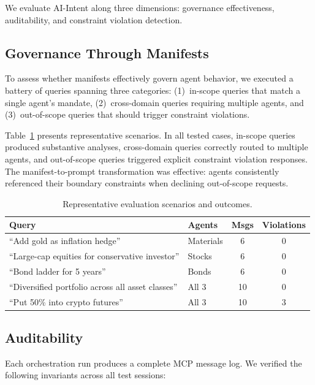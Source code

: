 \documentclass[runningheads]{llncs}
\begin{document}
We evaluate AI-Intent along three dimensions: governance effectiveness, auditability, and constraint violation detection.

\subsection{Governance Through Manifests}

To assess whether manifests effectively govern agent behavior, we executed a battery of queries spanning three categories: (1)~in-scope queries that match a single agent's mandate, (2)~cross-domain queries requiring multiple agents, and (3)~out-of-scope queries that should trigger constraint violations.

Table~\ref{tab:scenarios} presents representative scenarios. In all tested cases, in-scope queries produced substantive analyses, cross-domain queries correctly routed to multiple agents, and out-of-scope queries triggered explicit constraint violation responses. The manifest-to-prompt transformation was effective: agents consistently referenced their boundary constraints when declining out-of-scope requests.

\begin{table}[t]
\centering
\caption{Representative evaluation scenarios and outcomes.}
\label{tab:scenarios}
\begin{tabular}{@{}p{5.2cm}lcc@{}}
\toprule
\textbf{Query} & \textbf{Agents} & \textbf{Msgs} & \textbf{Violations} \\
\midrule
``Add gold as inflation hedge'' & Materials & 6 & 0 \\
``Large-cap equities for conservative investor'' & Stocks & 6 & 0 \\
``Bond ladder for 5 years'' & Bonds & 6 & 0 \\
``Diversified portfolio across all asset classes'' & All 3 & 10 & 0 \\
``Put 50\% into crypto futures'' & All 3 & 10 & 3 \\
\bottomrule
\end{tabular}
\end{table}

\subsection{Auditability}

Each orchestration run produces a complete MCP message log. We verified the following invariants across all test sessions:
\end{document}

